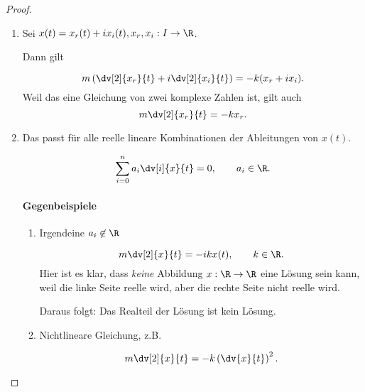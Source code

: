 \begin{proof}
	\begin{enumerate}
		\item Sei $x(t)=x_r(t)+i x_i(t), x_r, x_i: I\to\R$.

			Dann gilt

			 \[
				 m\left( \dv[2]{x_r}{t}+i\dv[2]{x_i}{t} \right) =-k(x_r+ix_i)
			.\] 
			Weil das eine Gleichung von zwei komplexe Zahlen ist, gilt auch
			\[
				m\dv[2]{x_r}{t}=-kx_r
			.\] 
		\item Das passt f\"{u}r alle reelle lineare Kombinationen der Ableitungen von $x(t)$.

			\[
				\sum_{i=0}^n a_i\dv[i]{x}{t}=0, \qquad a_i\in \R
			.\] 
			\paragraph{Gegenbeispiele}
			\begin{enumerate}[label=(\roman*)]
				\item Irgendeine $a_i\not\in \R$

\[
	m\dv[2]{x}{t}=-ikx(t), \qquad k\in \R
.\] 
Hier ist es klar, dass \emph{keine} Abbildung $x:\R\to \R$ eine L\"{o}sung sein kann, weil die linke Seite reelle wird, aber die rechte Seite nicht reelle wird.

Daraus folgt: Das Realteil der L\"{o}sung ist kein L\"{o}sung.

\item Nichtlineare Gleichung, z.B.

\[
	m\dv[2]{x}{t}=-k\left( \dv{x}{t} \right) ^2
.\] 
			\end{enumerate}


\end{enumerate}
\end{proof}
